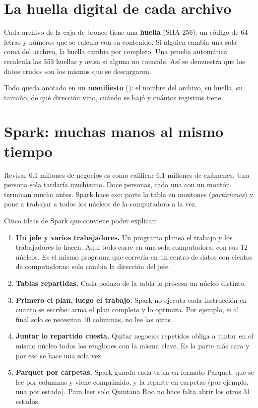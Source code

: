 \section{La huella digital de cada archivo}
Cada archivo de la caja de bronce tiene una \textbf{huella} (SHA-256): un código de 64 letras y números que se calcula con
su contenido. Si alguien cambia una sola coma del archivo, la huella cambia por completo. Una prueba automática recalcula
las 353 huellas y avisa si alguna no coincide. Así se demuestra que los datos crudos son los mismos que se descargaron.

Todo queda anotado en un \textbf{manifiesto} (): el nombre del archivo, su huella, su
tamaño, de qué dirección vino, cuándo se bajó y cuántos registros tiene.

\section{Spark: muchas manos al mismo tiempo}
\begin{intuicion}
Revisar 6.1 millones de negocios es como calificar 6.1 millones de exámenes. Una persona sola tardaría muchísimo. Doce
personas, cada una con un montón, terminan mucho antes. Spark hace eso: parte la tabla en montones (\emph{particiones}) y
pone a trabajar a todos los núcleos de la computadora a la vez.
\end{intuicion}

Cinco ideas de Spark que conviene poder explicar:
\begin{enumerate}
\item \textbf{Un jefe y varios trabajadores.} Un programa planea el trabajo y los trabajadores lo hacen. Aquí todo corre
  en una sola computadora, con sus 12 núcleos. Es el mismo programa que correría en un centro de datos con cientos de
  computadoras: solo cambia la dirección del jefe.
\item \textbf{Tablas repartidas.} Cada pedazo de la tabla lo procesa un núcleo distinto.
\item \textbf{Primero el plan, luego el trabajo.} Spark no ejecuta cada instrucción en cuanto se escribe: arma el plan
  completo y lo optimiza. Por ejemplo, si al final solo se necesitan 10 columnas, no lee las otras.
\item \textbf{Juntar lo repartido cuesta.} Quitar negocios repetidos obliga a juntar en el mismo núcleo todos los renglones
  con la misma clave. Es la parte más cara y por eso se hace una sola vez.
\item \textbf{Parquet por carpetas.} Spark guarda cada tabla en formato Parquet, que se lee por columnas y viene
  comprimido, y la reparte en carpetas (por ejemplo, una por estado). Para leer solo Quintana Roo no hace falta abrir los
  otros 31 estados.
\end{enumerate}

